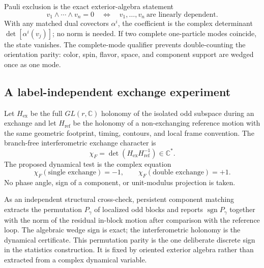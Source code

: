 \documentclass[11pt,letterpaper]{article}
\begin{document}
Pauli exclusion is the exact exterior-algebra statement
\begin{equation*}
  v_1\wedge\cdots\wedge v_n=0
  \quad\Longleftrightarrow\quad
  v_1,\ldots,v_n\ \text{are linearly dependent}.
\end{equation*}
With any matched dual covectors $\alpha^i$, the coefficient is the complex
determinant $\det[\alpha^i(v_j)]$; no norm is needed. If two complete
one-particle modes coincide, the state vanishes. The complete-mode qualifier
prevents double-counting the orientation parity: color, spin, flavor, space,
and component support are wedged once as one mode.

\subsection{A label-independent exchange experiment}\label{sec:exchange}

Let $H_{\mathrm{ex}}$ be the full $GL(r,\mathbb C)$ holonomy of the isolated
odd subspace during an exchange and let $H_{\mathrm{ref}}$ be the holonomy of a
non-exchanging reference motion with the same geometric footprint, timing,
contours, and local frame convention. The branch-free interferometric exchange
character is
\begin{equation*}
  \chi_F=\det\!\left(H_{\mathrm{ex}}H_{\mathrm{ref}}^{-1}\right)
  \in\mathbb C^{*}.
\end{equation*}
The proposed dynamical test is the complex equation
\begin{equation*}
  \chi_F(\text{single exchange})=-1,
  \qquad
  \chi_F(\text{double exchange})=+1.
\end{equation*}
No phase angle, sign of a component, or unit-modulus projection is taken.

As an independent structural cross-check, persistent component matching
extracts the permutation $P_{\gamma}$ of localized odd blocks and reports
$\operatorname{sgn}P_{\gamma}$ together with the norm of the residual in-block
motion after comparison with the reference loop. The algebraic wedge sign is
exact; the interferometric holonomy is the dynamical certificate. This
permutation parity is the one deliberate discrete sign in the statistics
construction. It is fixed by oriented exterior algebra rather than extracted
from a complex dynamical variable.
\end{document}
